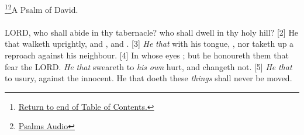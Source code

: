 


\footnote{\textcolor[cmyk]{0.99998,1,0,0}{\hyperlink{TOC}{Return to end of Table of Contents.}}}\footnote{\href{https://www.audioverse.org/english/audiobibles/books/ENGKJV/O/Ps/1}{\textcolor[cmyk]{0.99998,1,0,0}{Psalms Audio}}}\textcolor[cmyk]{0.99998,1,0,0}{A Psalm of David.}\\
\\
\textcolor[cmyk]{0.99998,1,0,0}{LORD, who shall abide in thy tabernacle? who shall dwell in thy holy hill?}
[2] \textcolor[cmyk]{0.99998,1,0,0}{He that walketh uprightly, and , and   .}
[3] \textcolor[cmyk]{0.99998,1,0,0}{\emph{He} \emph{that}  with his tongue,  , nor taketh up a reproach against his neighbour.}
[4] \textcolor[cmyk]{0.99998,1,0,0}{In whose eyes  ; but he honoureth them that fear the LORD. \emph{He} \emph{that} sweareth to \emph{his} \emph{own} hurt, and changeth not.}
[5] \textcolor[cmyk]{0.99998,1,0,0}{\emph{He} \emph{that}  to usury,  against the innocent. He that doeth these \emph{things} shall never be moved.}